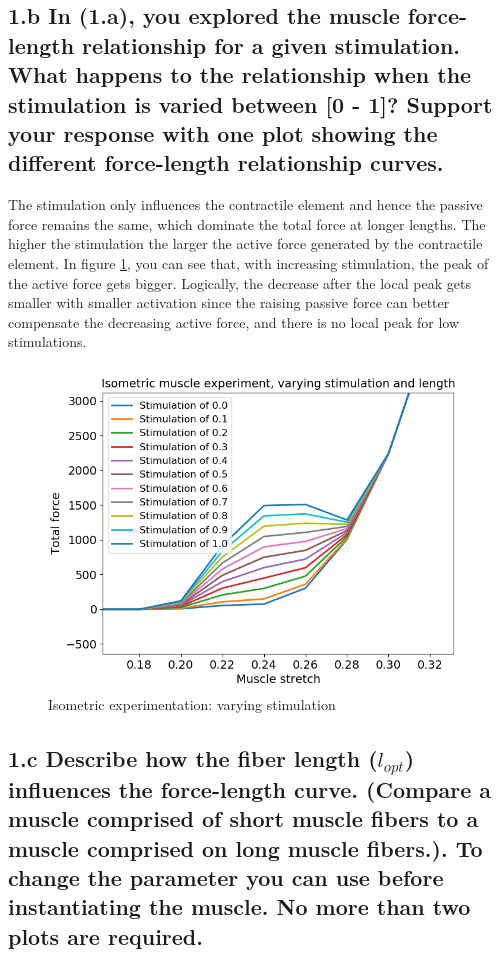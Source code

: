 \documentclass{cmc}
\begin{document}
\subsection*{1.b In (1.a), you explored the muscle force-length
  relationship for a given stimulation. What happens to the
  relationship when the stimulation is varied between [0 - 1]? Support
  your response with one plot showing the different force-length
  relationship curves.}

The stimulation only influences the contractile element and hence the passive force remains the same, which dominate the total force at longer lengths. The higher the stimulation the larger the active force generated by the contractile element. In figure \ref{fig:2a}, you can see that, with increasing stimulation, the peak of the active force gets bigger. Logically, the decrease after the local peak gets smaller with smaller activation since the raising passive force can better compensate the decreasing active force, and there is no local peak for low stimulations. 
\begin{figure}[H]
  \centering \includegraphics[scale=0.8]{figures/fig2}
  \caption{Isometric experimentation: varying stimulation}
  \label{fig:2a}
\end{figure}

\subsection*{1.c Describe how the fiber length ($l_{opt}$) influences
  the force-length curve.  (Compare a muscle comprised of short muscle
  fibers to a muscle comprised on long muscle fibers.). To change the
  parameter you can use
   before
  instantiating the muscle. No more than two plots are required. }
  
\end{document}
